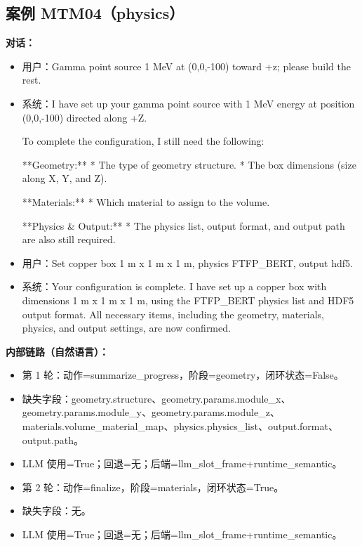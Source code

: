 \documentclass[11pt]{ctexart}
\begin{document}
\subsection{案例 MTM04（physics）}
\textbf{对话：}
\begin{itemize}
\item 用户：Gamma point source 1 MeV at (0,0,-100) toward +z; please build the rest.
\item 系统：I have set up your gamma point source with 1 MeV energy at position (0,0,-100) directed along +Z.

To complete the configuration, I still need the following:

**Geometry:**
*   The type of geometry structure.
*   The box dimensions (size along X, Y, and Z).

**Materials:**
*   Which material to assign to the volume.

**Physics \& Output:**
*   The physics list, output format, and output path are also still required.
\item 用户：Set copper box 1 m x 1 m x 1 m, physics FTFP\_BERT, output hdf5.
\item 系统：Your configuration is complete. I have set up a copper box with dimensions 1 m x 1 m x 1 m, using the FTFP\_BERT physics list and HDF5 output format. All necessary items, including the geometry, materials, physics, and output settings, are now confirmed.
\end{itemize}
\textbf{内部链路（自然语言）：}
\begin{itemize}
\item 第 1 轮：动作=summarize\_progress，阶段=geometry，闭环状态=False。
\item 缺失字段：geometry.structure、geometry.params.module\_x、geometry.params.module\_y、geometry.params.module\_z、materials.volume\_material\_map、physics.physics\_list、output.format、output.path。
\item LLM 使用=True；回退=无；后端=llm\_slot\_frame+runtime\_semantic。
\item 第 2 轮：动作=finalize，阶段=materials，闭环状态=True。
\item 缺失字段：无。
\item LLM 使用=True；回退=无；后端=llm\_slot\_frame+runtime\_semantic。
\end{itemize}
\end{document}
